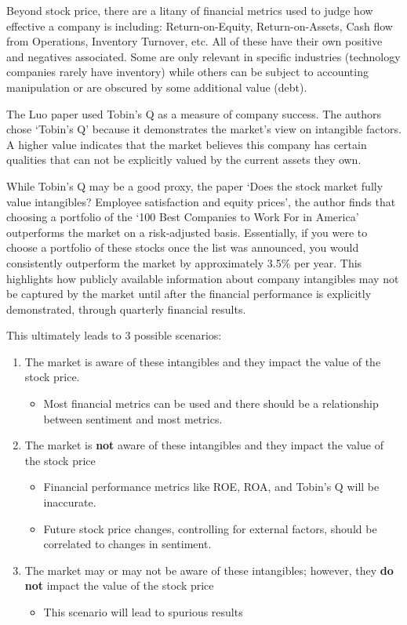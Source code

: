 \documentclass[conference, letterpaper]{IEEEtran}
\begin{document}
Beyond stock price, there are a litany of financial metrics used to judge how effective a company is including: Return-on-Equity, Return-on-Assets, Cash flow from Operations, Inventory Turnover, etc. 
All of these have their own positive and negatives associated.
Some are only relevant in specific industries (technology companies rarely have inventory) while others can be subject to accounting manipulation or are obscured by some additional value (debt). 

The Luo paper\cite{luo2016employee} used Tobin's Q as a measure of company success.
The authors chose `Tobin's Q' because it demonstrates the market's view on intangible factors.
A higher value indicates that the market believes this company has certain qualities that can not be explicitly valued by the current assets they own.

While Tobin's Q may be a good proxy, the paper `Does the stock market fully value intangibles? Employee satisfaction and equity prices'\cite{edmans}, the author finds that choosing a portfolio of the `100 Best Companies to Work For in America' outperforms the market on a risk-adjusted basis.  
Essentially, if you were to choose a portfolio of these stocks once the list was announced, you would consistently outperform the market by approximately 3.5\% per year.
This highlights how publicly available information about company intangibles may not be captured by the market until after the financial performance is explicitly demonstrated, through quarterly financial results.

This ultimately leads to 3 possible scenarios:
\begin{enumerate}
%
\item The market is aware of these intangibles and they impact the value of the stock price.
\begin{itemize}
\item Most financial metrics can be used and there should be a relationship between sentiment and most metrics.
\end{itemize}
%
\item The market is \textbf{not} aware of these intangibles and they impact the value of the stock price
\begin{itemize}
\item Financial performance metrics like ROE, ROA, and Tobin's Q will be inaccurate.
\item Future stock price changes, controlling for external factors, should be correlated to changes in sentiment.
\end{itemize}
%
\item The market may or may not be aware of these intangibles; however, they \textbf{do not} impact the value of the stock price
\begin{itemize}
\item This scenario will lead to spurious results
\end{itemize}
\end{enumerate}
\end{document}
